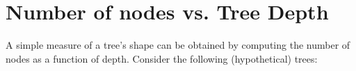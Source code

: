 \section{Number of nodes vs. Tree Depth}
\label{clades_vs_depth}

A simple measure of a tree's shape can be obtained by computing the number of
nodes as a function of depth. Consider the following (hypothetical) trees:
